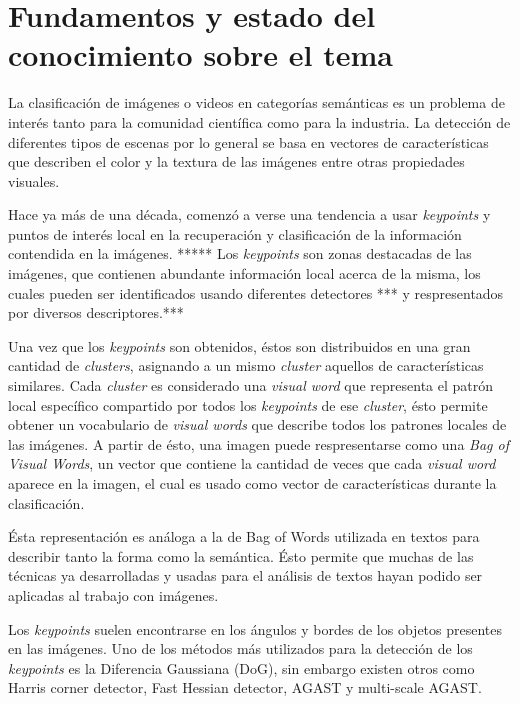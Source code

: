 \section{Fundamentos y estado del conocimiento sobre el tema}
\iffalse
Escriba una breve introducción general al tema y cite y comente las mayores
contribuciones en el tema específico, incluyendo bibliografıa actualizada.
\fi
La clasificación de imágenes o videos en categorías semánticas es un problema de interés tanto para la comunidad científica como
para la industria. La detección de diferentes tipos de escenas por lo general se basa en vectores de características que describen
el color y la textura de las imágenes entre otras propiedades visuales.

Hace ya más de una década, comenzó a verse una tendencia a usar \textit{keypoints} y puntos de interés local en la recuperación y
clasificación de la información contendida en la imágenes. ***** Los \textit{keypoints} son zonas destacadas de las imágenes, que contienen
abundante información local acerca de la misma, los cuales pueden ser identificados usando diferentes detectores *** y respresentados
por diversos descriptores.***

Una vez que los \textit{keypoints} son obtenidos, éstos son distribuidos en una gran cantidad de \textit{clusters}, asignando a un mismo
\textit{cluster} aquellos de características similares. Cada \textit{cluster} es considerado una \textit{visual word}
que representa el patrón local específico compartido por todos los \textit{keypoints} de ese \textit{cluster}, ésto permite obtener un
vocabulario de \textit{visual words} que describe todos los patrones locales de las imágenes. A partir
de ésto, una imagen puede respresentarse como una \textit{Bag of Visual Words}, un vector que contiene
la cantidad de veces que cada \textit{visual word} aparece en la imagen, el cual es usado como vector
de características durante la clasificación.

Ésta representación es análoga a la de Bag of Words utilizada en textos para describir tanto la forma
como la semántica. Ésto permite que muchas de las técnicas ya desarrolladas y usadas para el análisis de textos hayan podido ser aplicadas
al trabajo con imágenes.

Los \textit{keypoints} suelen encontrarse en los ángulos y bordes de los objetos presentes en las imágenes.
Uno de los métodos más utilizados para la detección de los \textit{keypoints} es la Diferencia Gaussiana (DoG), sin embargo existen otros como
Harris corner detector, Fast Hessian detector, AGAST y multi-scale AGAST. 

